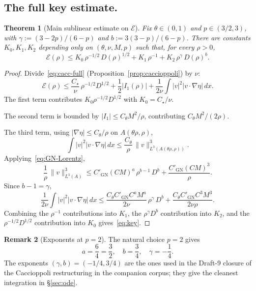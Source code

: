\documentclass[11pt]{amsart}
\newtheorem{theorem}{Theorem}[section]
\theoremstyle{definition}
\newtheorem{remark}[theorem]{Remark}
\newcommand{\EE}{\mathcal{E}}    %
\newcommand{\DD}{D}              %
\newcommand{\norm}[1]{\|#1\|}
\newcommand{\abs}[1]{|#1|}
\begin{document}
\subsection{The full key estimate.}

\begin{theorem}[Main sublinear estimate on $\EE$]
\label{thm:main-estimate}
Fix $\theta \in (0, 1)$ and $p \in (3/2, 3)$, with $\gamma :=
(3 - 2p)/(6 - p)$ and $b := 3(3 - p)/(6 - p)$. There are
constants $K_0, K_1, K_2$ depending only on $(\theta, \nu, M, p)$
such that, for every $\rho > 0$,
\begin{equation}\label{eq:key}
\EE(\rho) \leq K_0\,\rho^{-1/2}\,\DD(\rho)^{1/2}
          + K_1\,\rho^{-1}
          + K_2\,\rho^\gamma\,\DD(\rho)^b.
\end{equation}
\end{theorem}

\begin{proof}
Divide~\eqref{eq:cacc-full} (Proposition~\ref{prop:caccioppoli})
by $\nu$:
\[
\EE(\rho) \leq \frac{C_\star}{\nu}\,\rho^{-1/2}\DD^{1/2}
+ \frac{1}{2}\abs{I_1(\rho)}
+ \frac{1}{2\nu}\int \abs{v}^2\abs{v\cdot\nabla\eta}\,dx.
\]
The first term contributes $K_0\rho^{-1/2}\DD^{1/2}$ with
$K_0 = C_\star/\nu$.

The second term is bounded by
$\abs{I_1} \leq C_\theta M^2/\rho$, contributing
$C_\theta M^2/(2\rho)$.

The third term, using $\abs{\nabla\eta} \leq C_\theta/\rho$ on
$A(\theta\rho, \rho)$,
\[
\int \abs{v}^2 \abs{v\cdot\nabla\eta}\,dx
\leq \frac{C_\theta}{\rho}\,\norm{v}_{L^3(A(\theta\rho,\rho))}^3.
\]
Applying~\eqref{eq:GN-Lorentz},
\[
\frac{1}{\rho}\,\norm{v}_{L^3(A)}^3
\leq C'_{\mathrm{GN}}(CM)^a\,\rho^{b - 1}\,\DD^b
+ \frac{C'_{\mathrm{GN}}(CM)^3}{\rho}.
\]
Since $b - 1 = \gamma$,
\[
\frac{1}{2\nu}\int \abs{v}^2\abs{v\cdot\nabla\eta}\,dx
\leq \frac{C_\theta C'_{\mathrm{GN}} C^a M^a}{2\nu}\,\rho^\gamma\,\DD^b
+ \frac{C_\theta C'_{\mathrm{GN}} C^3 M^3}{2\nu\rho}.
\]
Combining the $\rho^{-1}$ contributions into $K_1$, the
$\rho^\gamma\DD^b$ contribution into $K_2$, and the
$\rho^{-1/2}\DD^{1/2}$ contribution into $K_0$
gives~\eqref{eq:key}.
\end{proof}

\begin{remark}[Exponents at $p = 2$]\label{rem:exponents}
The natural choice $p = 2$ gives
\[
a = \frac{6}{4} = \frac{3}{2}, \quad
b = \frac{3}{4}, \quad
\gamma = -\frac{1}{4}.
\]
The exponents $(\gamma, b) = (-1/4, 3/4)$ are the ones used in
the Draft-9 closure of the Caccioppoli restructuring in the
companion corpus; they give the cleanest integration in
\S\ref{sec:ode}.
\end{remark}
\end{document}
